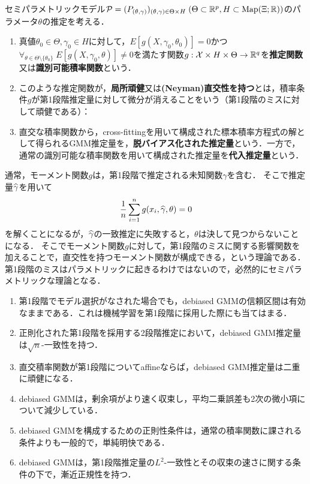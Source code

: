 \documentclass[uplatex,dvipdfmx]{jsreport}
\begin{document}
\begin{definition}
    セミパラメトリックモデル$\mathcal{P}=(P_{(\theta,\gamma)})_{(\theta,\gamma)\in\Theta\times H}\;(\Theta\subset\mathbb{R}^p,H\subset\mathrm{Map}(\Xi;\mathbb{R}))$のパラメータ$\theta$の推定を考える．
    \begin{enumerate}
        \item 真値$\theta_0\in\Theta,\gamma_0\in H$に対して，$E[g(X,\gamma_0,\theta_0)]=0$かつ$\forall_{\theta\in\Theta\setminus\{\theta_0\}}\;E[g(X,\gamma_0,\theta)]\ne 0$を満たす関数$g:\mathcal{X}\times H\times\Theta\to\mathbb{R}^q$を\textbf{推定関数}\cite{Bickel and Robins}又は\textbf{識別可能積率関数}\cite{Chernozhukov16}という．
        \item このような推定関数が，\textbf{局所頑健}又は\textbf{(Neyman)直交性を持つ}\cite{Chernozhukov16}とは，積率条件$g$が第1段階推定量に対して微分が消えることをいう（第1段階のミスに対して頑健である）：
        \item 直交な積率関数から，cross-fittingを用いて構成された標本積率方程式の解として得られるGMM推定量を，\textbf{脱バイアス化された推定量}という．一方で，通常の識別可能な積率関数を用いて構成された推定量を\textbf{代入推定量}という．
    \end{enumerate}
\end{definition}
\begin{remarks}
    通常，モーメント関数$g$は，第1段階で推定される未知関数$\gamma$を含む．
    そこで推定量$\widehat{\gamma}$を用いて
    \[\frac{1}{n}\sum_{i=1}^ng(x_i,\widehat{\gamma},\theta)=0\]
    を解くことになるが，$\widehat{\gamma}$の一致推定に失敗すると，$\theta$は決して見つからないことになる．
    そこでモーメント関数$g$に対して，第1段階のミスに関する影響関数を加えることで，直交性を持つモーメント関数が構成できる，という理論である．
    第1段階のミスはパラメトリックに起きるわけではないので，必然的にセミパラメトリックな理論となる．
\end{remarks}

\begin{advantage}\mbox{}
    \begin{enumerate}
        \item 第1段階でモデル選択がなされた場合でも，debiased GMMの信頼区間は有効なままである．これは機械学習を第1段階に採用した際にも当てはまる．
        \item 正則化された第1段階を採用する2段階推定において，debiased GMM推定量は$\sqrt{n}$-一致性を持つ．
        \item 直交積率関数が第1段階についてaffineならば，debiased GMM推定量は二重に頑健になる．
        \item debiased GMMは，剰余項がより速く収束し，平均二乗誤差も2次の微小項について減少している．
        \item debiased GMMを構成するための正則性条件は，通常の積率関数に課される条件よりも一般的で，単純明快である．
        \item debiased GMMは，第1段階推定量の$L^2$-一致性とその収束の速さに関する条件の下で，漸近正規性を持つ．
    \end{enumerate}
\end{advantage}
\end{document}
